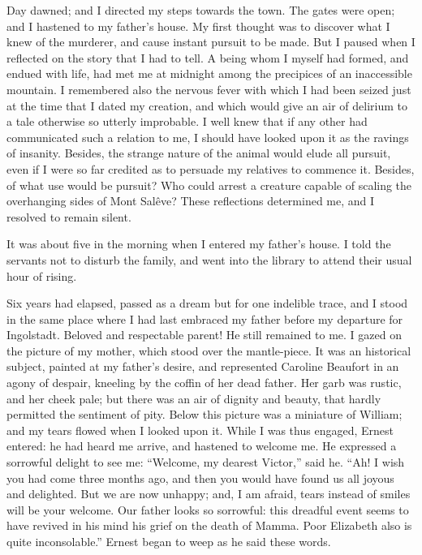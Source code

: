 Day dawned; and I directed my steps
towards the town. The gates were open;
and I hastened to my father's house.
My first thought was to discover what
I knew of the murderer, and cause instant
pursuit to be made. But I paused
when I reflected on the story that I had
to tell. A being whom I myself had
formed, and endued with life, had met
me at midnight among the precipices
of an inaccessible mountain. I remembered
also the nervous fever with which
I had been seized just at the time that
I dated my creation, and which would
give an air of delirium to a tale otherwise
so utterly improbable. I well
knew that if any other had communicated
such a relation to me, I should
have looked upon it as the ravings of
insanity. Besides, the strange nature
of the animal would elude all pursuit,
even if I were so far credited as to persuade
my relatives to commence it.
Besides, of what use would be pursuit?
Who could arrest a creature
capable of scaling the overhanging
sides of Mont Salêve? These reflections
determined me, and I resolved to
remain silent.

It was about five in the morning
when I entered my father's house. I
told the servants not to disturb the family,
and went into the library to attend
their usual hour of rising.

Six years had elapsed, passed as a
dream but for one indelible trace, and
I stood in the same place where I had
last embraced my father before my
departure for Ingolstadt. Beloved and
respectable parent! He still remained
to me. I gazed on the picture of my
mother, which stood over the mantle-piece.
It was an historical subject,
painted at my father's desire, and represented
Caroline Beaufort in an agony
of despair, kneeling by the coffin of
her dead father. Her garb was rustic,
and her cheek pale; but there was an
air of dignity and beauty, that hardly
permitted the sentiment of pity. Below
this picture was a miniature of
William; and my tears flowed when I
looked upon it. While I was thus engaged,
Ernest entered: he had heard
me arrive, and hastened to welcome
me. He expressed a sorrowful delight to
see me: ``Welcome, my dearest Victor,''
said he. ``Ah! I wish you had come
three months ago, and then you would
have found us all joyous and delighted.
But we are now unhappy; and, I am
afraid, tears instead of smiles will be
your welcome. Our father looks so
sorrowful: this dreadful event seems to
have revived in his mind his grief on
the death of Mamma. Poor Elizabeth
also is quite inconsolable.'' Ernest
began to weep as he said these
words.


